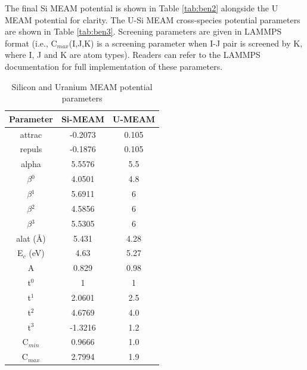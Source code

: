 \documentclass[review]{elsarticle}
\begin{document}
The final Si MEAM potential is shown in Table \ref{tab:ben2} alongside the U MEAM potential for clarity.  The U-Si MEAM cross-species potential parameters are shown in Table \ref{tab:ben3}.  Screening parameters are given in LAMMPS format (i.e., C$_{max}$(I,J,K) is a screening parameter when I-J pair is screened by K, where I, J and K are atom types).  Readers can refer to the LAMMPS \cite{plimpton1995} documentation for full implementation of these parameters.  

\begin{table}[h]
\caption{Silicon and Uranium MEAM potential parameters}\label{tab:ben2}
\begin{center}
\begin{tabular}{|c|c|c|}
     \hline
     Parameter & Si-MEAM  & U-MEAM  \\
     \hline
     attrac & -0.2073 & 0.105  \\
     repuls & -0.1876 & 0.105 \\
     alpha & 5.5576 & 5.5   \\
     $\beta$$^{0}$ & 4.0501 & 4.8  \\
     $\beta$$^{1}$ & 5.6911 & 6  \\
     $\beta$$^{2}$ & 4.5856 & 6 \\  
     $\beta$$^{3}$ & 5.5305 & 6  \\
     alat (\AA) & 5.431 & 4.28  \\
     E$_{c}$ (eV) & 4.63 & 5.27 \\
     A & 0.829 & 0.98 \\
     t$^{0}$ & 1 & 1 \\
     t$^{1}$ & 2.0601 & 2.5  \\
     t$^{2}$ & 4.6769 & 4.0 \\
     t$^{3}$ & -1.3216 & 1.2  \\
     C$_{min}$ & 0.9666 & 1.0 \\ 
     C$_{max}$ & 2.7994 & 1.9  \\
     \hline
\end{tabular}
\end{center}
\label{default}
\end{table}%
\end{document}
